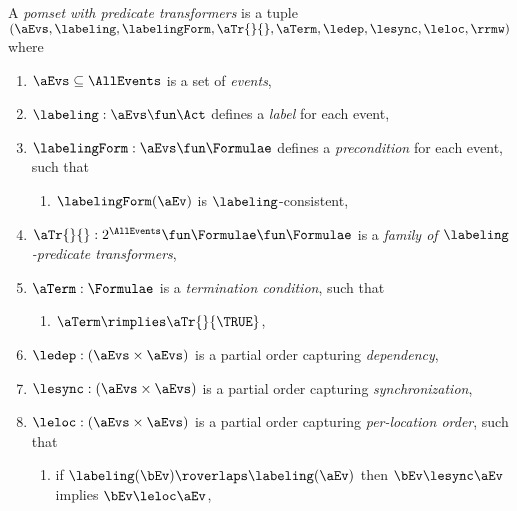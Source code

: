 \begin{definition}
  \label{def:pomset}
  A \emph{pomset with predicate transformers} 
  is a tuple $(\aEvs, \labeling, \labelingForm, \aTr{}{}, {\aTerm}, {\ledep}, {\lesync}, {\leloc}, {\rrmw})$ where
  \begin{enumerate}[,label=(\textsc{m}\arabic*),ref=\textsc{m}\arabic*]
  \item \label{pom-E} 
    $\aEvs\subseteq\AllEvents$ is a set of \emph{events},
  \item \label{pom-lambda} 
    $\labeling: \aEvs \fun \Act$ defines a \emph{label} for each event,
  \item \label{pom-kappa} 
    $\labelingForm:\aEvs\fun\Formulae$ defines a \emph{precondition} for each event,
    such that
    \begin{enumerate}
    \item \label{pom-kappa-sat}
      $\labelingForm(\aEv)$ is $\labeling$-consistent,
    \end{enumerate}
  \item \label{pom-tau} 
    $\aTr{}{}:2^{\AllEvents}\fun\Formulae \fun\Formulae$ is a \emph{family of $\labeling$-predicate transformers}, 
  \item \label{pom-term} 
    $\aTerm:\Formulae$ is a \emph{termination condition}, such that 
    \begin{enumerate}
    \item \label{pom-term-tau}
      $\aTerm\rimplies\aTr{}{\TRUE}$,
    \end{enumerate}
  \item \label{pom-ledep} 
    ${\ledep} : (\aEvs\times\aEvs)$ is a partial order capturing \emph{dependency},
  \item \label{pom-lesync} 
    ${\lesync} : (\aEvs\times\aEvs)$ is a partial order capturing \emph{synchronization}, 
  \item \label{pom-leloc} 
    ${\leloc} : (\aEvs\times\aEvs)$ is a partial order capturing \emph{per-location order}, such that 
    \begin{enumerate}
    \item \label{pom-leloc-lesync}
      if $\labeling(\bEv)\roverlaps\labeling(\aEv)$ 
      then $\bEv\lesync\aEv$ implies $\bEv\leloc\aEv$,      

\end{enumerate}
\end{enumerate}
\end{definition}
